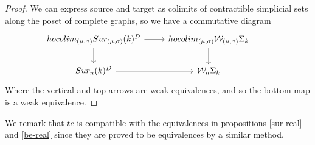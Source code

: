 \begin{proof}
	We can express source and target as colimits of contractible %
	simplicial sets along the poset of complete graphs,
	so we have a commutative diagram
	\begin{equation*}
		\begin{tikzcd}
			hocolim_{(\mu,\sigma)}\sur_{(\mu,\sigma)}(k)^{D} \arrow[r] \arrow[d]& hocolim_{(\mu,\sigma)}\mathcal{W}_{(\mu,\sigma)}\Sigma_{k} \arrow[d] \\
			\sur_{n}(k)^{D}\arrow[r] & \mathcal{W}_{n}\Sigma_{k}&
		\end{tikzcd}
	\end{equation*}
	Where the vertical and top arrows
	are weak equivalences, and so the bottom map is a weak equivalence.
\end{proof}
We remark that $tc$ is compatible with the equivalences in propositions \ref{sur-real} and \ref{be-real} since they are proved to be equivalences by a similar method.




